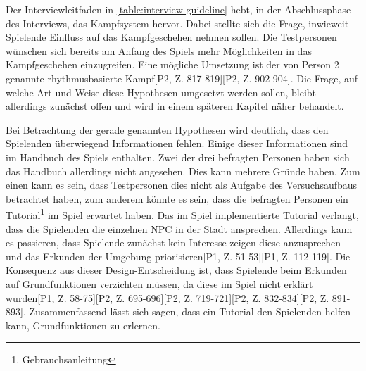 Der Interviewleitfaden in \autoref{table:interview-guideline} hebt, in der Abschlussphase des Interviews, das Kampfsystem hervor. Dabei stellte sich die Frage, inwieweit Spielende Einfluss auf das Kampfgeschehen nehmen sollen. Die Testpersonen wünschen sich bereits am Anfang des Spiels mehr Möglichkeiten in das Kampfgeschehen einzugreifen\hypothesis[P1, Z. 572-601][P2, Z. 898-901][P3, Z. 1336-1343]. Eine mögliche Umsetzung ist der von Person 2 genannte rhythmusbasierte Kampf[P2, Z. 817-819][P2, Z. 902-904]. Die Frage, auf welche Art und Weise diese Hypothesen umgesetzt werden sollen, bleibt allerdings zunächst offen und wird in einem späteren Kapitel näher behandelt.

Bei Betrachtung der gerade genannten Hypothesen wird deutlich, dass den Spielenden überwiegend Informationen fehlen. Einige dieser Informationen sind im Handbuch des Spiels enthalten. Zwei der drei befragten Personen haben sich das Handbuch allerdings nicht angesehen. Dies kann mehrere Gründe haben. Zum einen kann es sein, dass Testpersonen dies nicht als Aufgabe des Versuchsaufbaus betrachtet haben, zum anderem 
könnte es sein, dass die befragten Personen ein Tutorial\footnote{Gebrauchsanleitung} im Spiel erwartet haben. Das im Spiel implementierte Tutorial verlangt, dass die Spielenden die einzelnen \ac{NPC} in der Stadt ansprechen. Allerdings kann es passieren, dass Spielende zunächst kein Interesse zeigen diese anzusprechen und das Erkunden der Umgebung priorisieren[P1, Z. 51-53][P1, Z. 112-119]. Die Konsequenz aus dieser Design-Entscheidung ist, dass Spielende beim Erkunden auf Grundfunktionen verzichten müssen, da diese im Spiel nicht erklärt wurden[P1, Z. 58-75][P2, Z. 695-696][P2, Z. 719-721][P2, Z. 832-834][P2, Z. 891-893]. Zusammenfassend lässt sich sagen, dass ein Tutorial den Spielenden helfen kann, Grundfunktionen zu erlernen\hypothesis.

